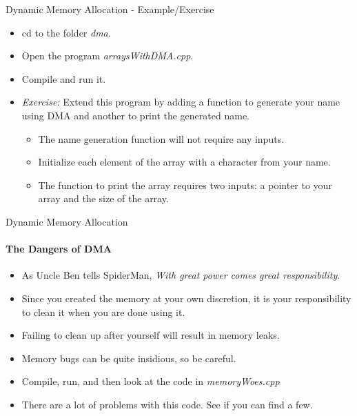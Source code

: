 \documentclass[aspectratio=169]{beamer}
\begin{document}
\begin{frame}[fragile]{Dynamic Memory Allocation - Example/Exercise}
    \begin{itemize}
        \item cd to the folder \textit{dma}.
        \item Open the program \textit{arraysWithDMA.cpp}.
        \item Compile and run it.
        \item \textit{Exercise:} Extend this program by adding a function to generate your name using DMA and another to print the generated name.
        \begin{itemize}
            \item The name generation function will not require any inputs.
            \item Initialize each element of the array with a character from your name.
            \item The function to print the array requires two inputs: a pointer to your array and the size of the array.
        \end{itemize}
    \end{itemize}
\end{frame}

\begin{frame}[fragile]{Dynamic Memory Allocation}
    \framesubtitle{The Dangers of DMA}
    \begin{itemize}
        \item As Uncle Ben tells SpiderMan, \textit{With great power comes great responsibility}.
        \item Since you created the memory at your own discretion, it is your responsibility to clean it when you are done using it.
        \item Failing to clean up after yourself will result in memory leaks.
        \item Memory bugs can be quite insidious, so be careful.
        \item Compile, run, and then look at the code in \textit{memoryWoes.cpp}
        \item There are a lot of problems with this code. See if you can find a few.
    \end{itemize}
\end{frame}
\end{document}
